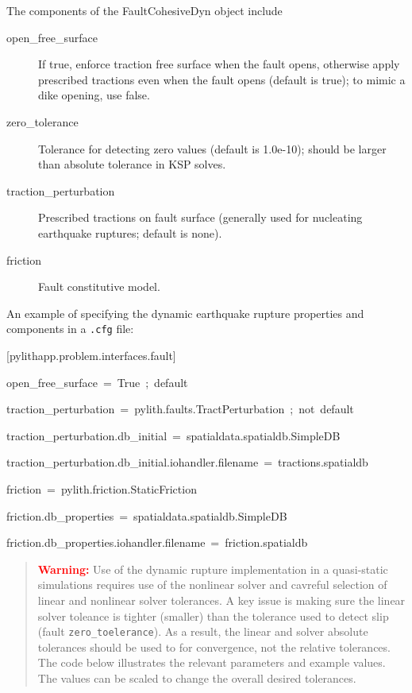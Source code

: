 The components of the FaultCohesiveDyn object include
\begin{description}
\item [{open\_free\_surface}] If true, enforce traction free surface when
the fault opens, otherwise apply prescribed tractions even when the
fault opens (default is true); to mimic a dike opening, use false.
\item [{zero\_tolerance}] Tolerance for detecting zero values (default
is 1.0e-10); should be larger than absolute tolerance in KSP solves.
\item [{traction\_perturbation}] Prescribed tractions on fault surface
(generally used for nucleating earthquake ruptures; default is none).
\item [{friction}] Fault constitutive model.
\end{description}
An example of specifying the dynamic earthquake rupture properties
and components in a \texttt{.cfg} file:
\begin{lyxcode}
{[}pylithapp.problem.interfaces.fault{]}

open\_free\_surface~=~True~;~default

traction\_perturbation~=~pylith.faults.TractPerturbation~;~not~default

traction\_perturbation.db\_initial~=~spatialdata.spatialdb.SimpleDB

traction\_perturbation.db\_initial.iohandler.filename~=~tractions.spatialdb

friction~=~pylith.friction.StaticFriction

friction.db\_properties~=~spatialdata.spatialdb.SimpleDB

friction.db\_properties.iohandler.filename~=~friction.spatialdb\end{lyxcode}
\begin{quote}
\textbf{\textcolor{red}{Warning:}}\textbf{ }Use of the dynamic rupture
implementation in a quasi-static simulations requires use of the nonlinear
solver and cavreful selection of linear and nonlinear solver tolerances.
A key issue is making sure the linear solver toleance is tighter (smaller)
than the tolerance used to detect slip (fault \texttt{zero\_toelerance}).
As a result, the linear and solver absolute tolerances should be used
to for convergence, not the relative tolerances. The code below illustrates
the relevant parameters and example values. The values can be scaled
to change the overall desired tolerances.\end{quote}
